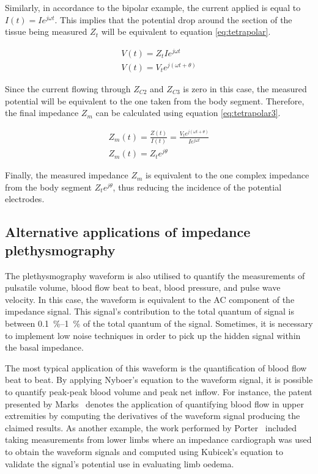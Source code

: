 Similarly, in accordance to the bipolar example, the current applied is equal to $I(t)=I e^{j \omega t}$. This implies that the potential drop around the section of the tissue being measured $Z_t$ will be equivalent to equation \ref{eq:tetrapolar}.

\begin{gather}
	\label{eq:tetrapolar}
	V(t) = Z_t I e^{j \omega t} \\
	\label{eq:tetrapolar2}
	V(t) = V_t e^{j (\omega t + \theta)}
\end{gather} 

Since the current flowing through $Z_{C2}$ and $Z_{C3}$ is zero in this case, the measured potential will be equivalent to the one taken from the body segment. Therefore, the final impedance $Z_m$ can be calculated using equation \ref{eq:tetrapolar3}.

\begin{gather}
	\label{eq:tetrapolar3}
	Z_m(t) = \frac{Z(t)}{I(t)} = \frac{V_t e^{j(\omega t + \theta)}}{I e^{j\omega t}} \\
	\label{eq:tetrapolar4}
	Z_m(t) = Z_t e^{j \theta}
\end{gather}

Finally, the measured impedance $Z_m$ is equivalent to the one complex impedance from the body segment $Z_t e^{j \theta}$, thus reducing the incidence of the potential electrodes. 

\subsection{Alternative applications of impedance plethysmography}
The plethysmography waveform is also utilised to quantify the measurements of pulsatile volume, blood flow beat to beat, blood pressure, and pulse wave velocity. In this case, the waveform is equivalent to the AC component of the impedance signal. This signal's contribution to the total quantum of signal is between \SIrange{0.1}{1}{\percent} of the total quantum of the signal. Sometimes, it is necessary to implement low noise techniques in order to pick up the hidden signal within the basal impedance. 

The most typical application of this waveform is the quantification of blood flow beat to beat. By applying Nyboer's equation to the waveform signal, it is possible to quantify peak-peak blood volume and peak net inflow. For instance, the patent presented by Marks~\cite{marks1985computer} denotes the application of quantifying blood flow in upper extremities by computing the derivatives of the waveform signal producing the claimed results. As another example, the work performed by Porter~\cite{porter1985measurement} included taking measurements from lower limbs where an impedance cardiograph was used to obtain the waveform signals and computed using Kubicek's equation \cite{karnegis1966development, kubicek1970impedance, kubicek1979impedance} to validate the signal's potential use in evaluating limb oedema. 

